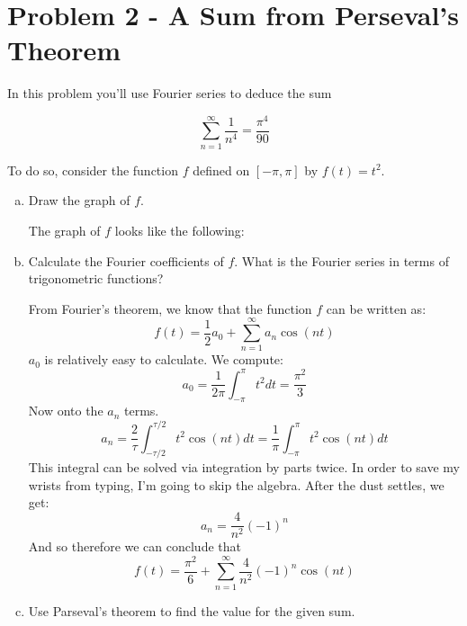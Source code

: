 \documentclass[10pt]{article}
\begin{document}
    \pagebreak

    \section*{Problem 2 - A Sum from Perseval's Theorem}

    In this problem you'll use Fourier series to deduce the sum

    \[ \sum_{n = 1}^\infty \frac{1}{n^4} = \frac{\pi^4}{90}\] 

    To do so, consider the function $f$ defined on $[-\pi, \pi]$ by $f(t) = t^2$. 

    \begin{enumerate}[(a)]
        \item Draw the graph of $f$. 

        \begin{solution}
            The graph of $f$ looks like the following:
            \begin{center}
            \end{center}
        \end{solution}
        \item Calculate the Fourier coefficients of $f$. What is the Fourier series in terms of trigonometric functions?
        
        \begin{solution}
            From Fourier's theorem, we know that the function $f$ can be written as: 
            \[ f(t) = \frac{1}{2} a_0 + \sum_{n= 1}^\infty a_n \cos(nt)\]
            $a_0$ is relatively easy to calculate. We compute: 
            \[ a_0 = \frac{1}{2\pi}\int_{-\pi}^\pi t^2 dt = \frac{\pi^2}{3}\] 
            Now onto the $a_n$ terms.
            \[ a_n = \frac{2}{\tau} \int_{-\tau/2}^{\tau/2} t^2 \cos (nt) dt = \frac{1}{\pi} \int_{-\pi}^\pi t^2 \cos(nt) dt\]
            This integral can be solved via integration by parts twice. In order to save my wrists from typing, I'm going to skip the algebra. After the dust settles, we get:
            \[ a_n = \frac{4}{n^2}(-1)^n\]  
            And so therefore we can conclude that 
            \[ f(t) = \frac{\pi^2}{6} + \sum_{n = 1}^\infty \frac{4}{n^2} (-1)^n \cos(nt)\] 
        \end{solution}
        \item Use Parseval's theorem to find the value for the given sum. 
        

\end{enumerate}
\end{document}

